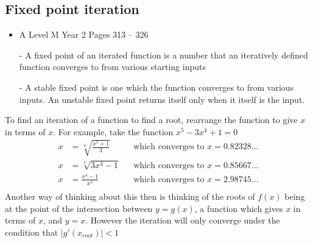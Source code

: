 \documentclass[11pt, a4paper]{article}
\begin{document}
\subsection{Fixed point iteration}
\begin{itemize}
\item A Level M Year 2 \hspace{1cm} \phantom{ AS / } Pages 313 -- 326
\end{itemize} \par
\begin{figure}[H]
\centering
{}
\end{figure}
\begin{itemize}
\item[-] A fixed point of an iterated function is a number that an iteratively defined function converges to from various starting inputs
\item[-] A stable fixed point is one which the function converges to from various inputs. An unstable fixed point returns itself only when it itself is the input.
\end{itemize}
To find an iteration of a function to find a root, rearrange the function to give $x$ in terms of $x$. For example, take the function $x^{5}-3x^{4}+1=0$
\begin{align*}
x&=\sqrt[4]{\frac{x^{5}+1}{3}} & &\text{which converges to }x=0.82328\ldots \\
x&=\sqrt[5]{3x^{4}-1} & &\text{which converges to }x=0.85667\ldots \\
x&=\frac{x^{4}-1}{x^{4}} & &\text{which converges to }x=2.98745\ldots \\
\end{align*}
Another way of thinking about this then is thinking of the roots of $f(x)$ being at the point of the intersection between $y=g(x)$, a function which gives $x$ in terms of $x$, and $y=x$. However the iteration will only converge under the condition that $\left| g'\left( x_{root} \right) \right|<1$ \newline \par
\end{document}
